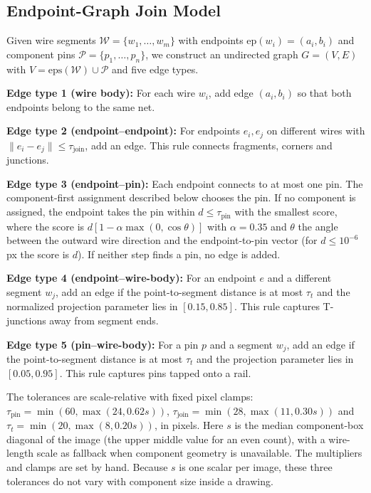 \documentclass[journal]{IEEEtran}
\begin{document}
\subsection{Endpoint-Graph Join Model}
\label{sec:join_model}

Given wire segments $\mathcal{W} = \{w_1, \ldots, w_m\}$ with endpoints $\text{ep}(w_i) = (a_i, b_i)$ and component pins $\mathcal{P} = \{p_1, \ldots, p_n\}$, we construct an undirected graph $G = (V, E)$ with $V = \text{eps}(\mathcal{W}) \cup \mathcal{P}$ and five edge types.

\textbf{Edge type 1 (wire body):} For each wire $w_i$, add edge $(a_i,b_i)$ so that both endpoints belong to the same net.

\textbf{Edge type 2 (endpoint--endpoint):} For endpoints $e_i,e_j$ on different wires with $\|e_i-e_j\|\leq\tau_{\text{join}}$, add an edge. This rule connects fragments, corners and junctions.

\textbf{Edge type 3 (endpoint--pin):} Each endpoint connects to at most one pin. The component-first assignment described below chooses the pin. If no component is assigned, the endpoint takes the pin within $d\leq\tau_{\text{pin}}$ with the smallest score, where the score is $d[1-\alpha\max(0,\cos\theta)]$ with $\alpha=0.35$ and $\theta$ the angle between the outward wire direction and the endpoint-to-pin vector (for $d\le10^{-6}$\,px the score is $d$). If neither step finds a pin, no edge is added.

\textbf{Edge type 4 (endpoint--wire-body):} For an endpoint $e$ and a different segment $w_j$, add an edge if the point-to-segment distance is at most $\tau_t$ and the normalized projection parameter lies in $[0.15,0.85]$. This rule captures T-junctions away from segment ends.

\textbf{Edge type 5 (pin--wire-body):} For a pin $p$ and a segment $w_j$, add an edge if the point-to-segment distance is at most $\tau_t$ and the projection parameter lies in $[0.05,0.95]$. This rule captures pins tapped onto a rail.

The tolerances are scale-relative with fixed pixel clamps: $\tau_{\text{pin}}=\min(60,\max(24,0.62s))$, $\tau_{\text{join}}=\min(28,\max(11,0.30s))$ and $\tau_t=\min(20,\max(8,0.20s))$, in pixels. Here $s$ is the median component-box diagonal of the image (the upper middle value for an even count), with a wire-length scale as fallback when component geometry is unavailable. The multipliers and clamps are set by hand. Because $s$ is one scalar per image, these three tolerances do not vary with component size inside a drawing.
\end{document}
